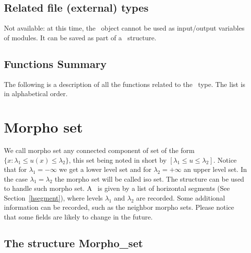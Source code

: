 \subsection{Related file (external) types}
\label{hsegment-file_type}

Not available: at this time, the \hsegment\ object cannot be used as input/output variables of modules.
It can be saved as part of a \mset\ structure.

\subsection{Functions Summary}
\label{hsegment-function}

The following is a description of all the functions related to 
the \hsegment\ type. The list is in alphabetical order.

\newpage %




\section{Morpho set}


\label{morpho_set}

We call morpho set  any connected component of set of the form
$\{x : \lambda_1 \leq u(x) \leq \lambda_2\}$, this set being noted in short by
$[\lambda_1 \leq u \leq \lambda_2]$. Notice that for $\lambda_1=-\infty$ we get
a lower level set and for $\lambda_2=+\infty$ an upper level 
set. In the case $\lambda_1 = \lambda_2$ the morpho set
will be called iso set.
The structure \mset{} can be used to handle such
morpho set. A \mset\ is given by a list of horizontal segments (See Section~\ref{hsegment}),
where levels $\lambda_1$ and $\lambda_2$ are recorded. Some additional information can
be recorded, such as the neighbor morpho sets. 
Please notice that some fields are likely to change in the future.

\subsection{The structure Morpho\_set}
\label{mset-structure}

